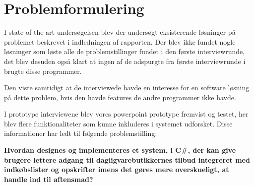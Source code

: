 \section{Problemformulering}\label{section:problemformulering}

I state of the art undersøgelsen  blev der undersøgt eksisterende løsninger på problemet beskrevet i indledningen af rapporten. 
Der blev ikke fundet nogle løsninger som løste alle de problemstillinger fundet i den første interviewrunde, det blev desuden også klart at ingen af de adspurgte fra første interviewrunde i  brugte disse programmer.

Den viste samtidigt at de interviewede havde en interesse for en software løsning på dette problem, hvis den havde  features de andre programmer ikke havde. 

I prototype interviewene blev vores powerpoint prototype fremvist og testet, her blev flere funktionaliteter som kunne inkluderes i systemet udforsket.
Disse informationer har ledt til følgende problemstilling:

\textbf{Hvordan designes og implementeres et system, i C\#, der kan give brugere lettere adgang til dagligvarebutikkernes tilbud integreret med indkøbslister og opskrifter imens det gøres mere overskueligt, at handle ind til aftensmad? }
